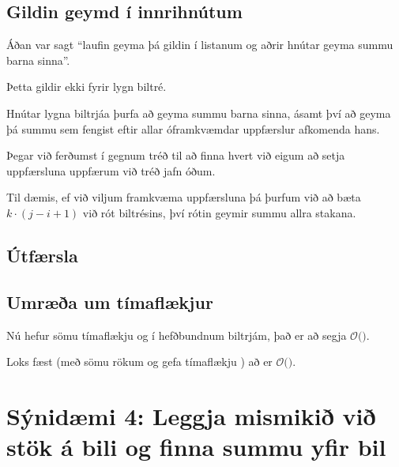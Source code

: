 \subsection{Gildin geymd í innrihnútum}
{
	{
		\item<1-> Áðan var sagt ``laufin geyma þá gildin í listanum og aðrir hnútar geyma summu barna sinna''.
		\item<2-> Þetta gildir ekki fyrir lygn biltré.
		\item<3-> Hnútar lygna biltrjáa þurfa að geyma summu barna sinna,
					ásamt því að geyma þá summu sem fengist eftir allar óframkvæmdar uppfærslur afkomenda hans.
		\item<4-> Þegar við ferðumst í gegnum tréð til að finna hvert við eigum að setja uppfærsluna uppfærum við tréð jafn óðum.
		\item<5-> Til dæmis, ef við viljum framkvæma uppfærsluna  þá þurfum við að bæta $k \cdot (j - i + 1)$ við rót biltrésins,
					því rótin geymir summu allra stakana.
	}
}

\subsection{Útfærsla}
{
}

\subsection{Umræða um tímaflækjur}
{
	{
		\item<1-> Nú hefur  sömu tímaflækju og í hefðbundnum biltrjám, það er að segja $\mathcal{O}($\onslide<2->{$\log n$}$)$.
		\item<3-> Loks fæst (með sömu rökum og gefa tímaflækju ) að  er
					$\mathcal{O}($\onslide<4->{$\log n$}$)$.
	}
}

\section{Sýnidæmi 4: Leggja mismikið við stök á bili og finna summu yfir bil}
